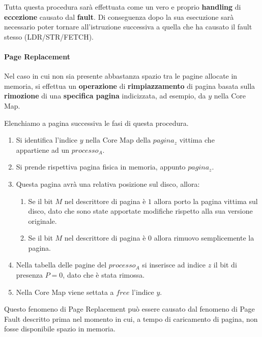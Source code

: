 \documentclass{article}
\begin{document}
Tutta questa procedura sarà effettuata come un vero e proprio \textbf{handling} di \textbf{eccezione} causato dal \textbf{fault}. Di conseguenza dopo la sua esecuzione sarà necessario poter tornare all'istruzione successiva a quella che ha causato il fault stesso (LDR/STR/FETCH).

\vspace*{10px}

\paragraph{Page Replacement}

Nel caso in cui non sia presente abbastanza spazio tra le pagine allocate in memoria, si effettua un \textbf{operazione} di \textbf{rimpiazzamento} di pagina
basata sulla \textbf{rimozione} di una \textbf{specifica pagina} indicizzata, ad esempio, da $y$ nella Core Map.

\vspace*{10px}

Elenchiamo a pagina successiva le fasi di questa procedura.

\newpage

\begin{enumerate}
    \item Si identifica l'indice $y$ nella Core Map della $pagina_{z}$ vittima che \\ appartiene ad un $processo_{A}$.
    \item Si prende rispettiva pagina fisica in memoria, appunto $pagina_{z}$.
    \item Questa pagina avrà una relativa posizione sul disco, allora:
    \begin{enumerate}
        \item Se il bit $M$ nel descrittore di pagina è $1$ allora porto la pagina vittima sul disco, dato che sono state apportate modifiche rispetto alla sua versione originale.
        \item Se il bit $M$ nel descrittore di pagina è $0$ allora rimuovo semplicemente la pagina.
    \end{enumerate}
    \item Nella tabella delle pagine del $processo_{A}$ si inserisce ad indice $z$ il bit di presenza $P=0$, dato che è stata rimossa.
    \item Nella Core Map viene settata a $free$ l'indice $y$.
\end{enumerate}

Questo fenomeno di Page Replacement può essere causato dal fenomeno di Page Fault descritto prima nel momento in cui, a tempo di caricamento di pagina, non fosse disponibile spazio in memoria.
\end{document}

